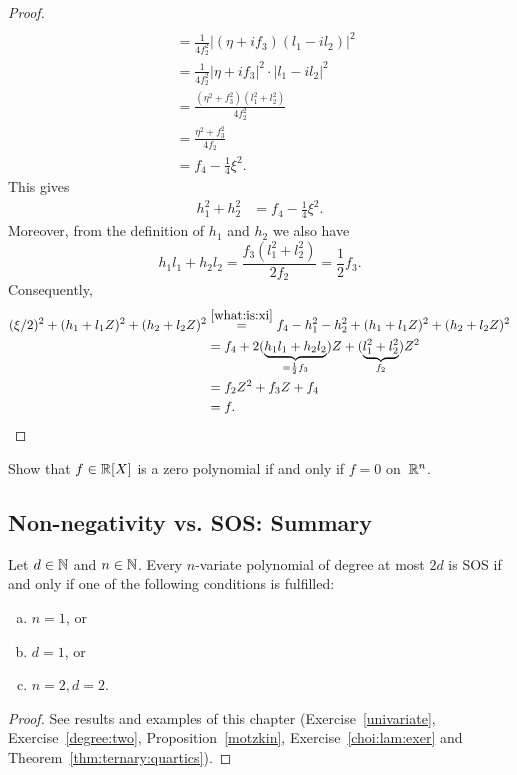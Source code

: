\begin{proof}
\begin{align*}
		\\ & = \frac{1}{4 f_2^2}|(\eta+ i f_3)(l_1 - i l_2)|^2 
		\\ & = \frac{1}{4 f_2^2}|\eta+ i f_3|^2 \cdot |l_1 - i l_2|^2
		\\ & = \frac{(\eta^2 + f_3^2)(l_1^2 + l_2^2)}{4 f_2^2} 
		\\ & = \frac{\eta^2 + f_3^2}{4 f_2} 
		\\ & = f_4 - \frac{1}{4} \xi^2. 
	\end{align*}
	This gives
	\begin{align}
		h_1^2 + h_2^2 & = f_4 - \frac{1}{4} \xi^2. \label{what:is:xi}
	\end{align}
	Moreover, from the definition of $h_1$ and $h_2$ we also have 
	\[
	h_1 l_1 + h_2 l_2 = \frac{f_3 (l_1^2 + l_2^2)}{2 f_2} = \frac{1}{2} f_3.
	\]
	Consequently, 
	\begin{align*}
	(\xi/2)^2 + (h_1 + l_1 Z)^2 + (h_2 + l_2 Z)^2 & \stackrel{\eqref{what:is:xi}}{=} f_4 - h_1^2 - h_2^2 + (h_1 + l_1 Z)^2 + (h_2 + l_2 Z)^2 
	\\ & = f_4 + 2 (\underbrace{h_1 l_1 + h_2 l_2}_{=\frac{1}{2} f_3}) Z + (\underbrace{l_1^2 + l_2^2}_{f_2}) Z^2 
	\\ & = f_2 Z^2 + f_3 Z+ f_4 
	\\ & = f. \qedhere
	\end{align*}
\end{proof}

\begin{exercise}
	Show that $f \in \mathbb{R}[X]$ is a zero polynomial if and only if $f=0$ on~$\mathbb{R}^n$.
\end{exercise} 

\subsection{Non-negativity vs. SOS: Summary}

\begin{theorem}
	Let $d \in \mathbb{N}$ and $n \in \mathbb{N}$. Every $n$-variate  polynomial of degree at most $2d$ is SOS if and only if one of the following conditions is fulfilled:
	\begin{enumerate}[(a)]
		\item $n=1$, or
		\item $d=1$, or
		\item $n=2, d=2$.
	\end{enumerate}
\end{theorem}
\begin{proof}
	See results and examples of this chapter (Exercise~\ref{univariate}, Exercise~\ref{degree:two}, Proposition~\ref{motzkin}, Exercise~\ref{choi:lam:exer} and Theorem~\ref{thm:ternary:quartics}).
\end{proof}




